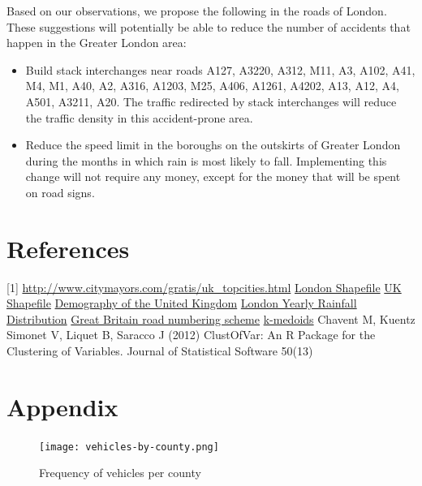 \documentclass{neu_handout}
\begin{document}
Based on our observations, we propose the following in the roads of London.  These suggestions will potentially be able to reduce the number of accidents that happen in the Greater London area:

\begin{itemize}
\item{Build stack interchanges near roads A127, A3220, A312, M11, A3, A102, A41, M4, M1, A40, A2, A316, A1203, M25, A406, A1261, A4202, A13, A12, A4, A501, A3211, A20. The traffic redirected by stack interchanges will reduce the traffic density in this accident-prone area.}

\item{Reduce the speed limit in the boroughs on the outskirts of Greater London during the months in which rain is most likely to fall. Implementing this change will not require any money, except for the money that will be spent on road signs.}

\end{itemize}  


\section{References}
 [1] \url{http://www.citymayors.com/gratis/uk_topcities.html}
\newline
 [2] \href{https://data.london.gov.uk/dataset/statistical-gis-boundary-files-london}{London Shapefile}
 \newline
 [3] \href{http://www.naturalearthdata.com} {UK Shapefile}
 \newline
 [4] \href{https://en.wikipedia.org/wiki/Demography_of_the_United_Kingdom}{Demography of the United Kingdom}
 \newline
 [5] \href{http://projectbritain.com/climate.html}{London Yearly Rainfall Distribution}
 \newline
 [6] \href{https://en.wikipedia.org/wiki/Great_Britain_road_numbering_scheme}{Great Britain road numbering scheme}
 \newline
 [7] \href{https://en.wikipedia.org/wiki/K-medoids}{k-medoids}
 \newline
 [8] Chavent M, Kuentz Simonet V, Liquet B, Saracco J (2012) ClustOfVar: An R Package for the Clustering of Variables. Journal of Statistical Software 50(13)


\pagebreak
\section{Appendix}
\begin{figure}[!htb]
  \texttt{[image: vehicles-by-county.png]}
  \caption{Frequency of vehicles per county}
\end{figure}
\end{document}
